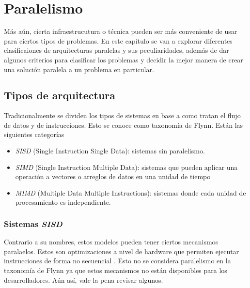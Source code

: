 \chapter{Paralelismo}
\label{cap:paralelism}

Más aún, cierta infraestrucutura o técnica pueden ser más conveniente de usar
para ciertos tipos de problemas. En este capítulo se van a explorar diferentes
clasificaiones de arquitecturas paralelas y sus peculiaridades, además de dar
algunos criterios para clasificar los problemas y decidir la mejor manera de
crear una solución paralela a un problema en particular.

\section{Tipos de arquitectura}

Tradicionalmente se dividen los tipos de sistemas en base a como tratan el flujo
de datos y de instrucciones. Esto se conoce como taxonomía de Flynn. Están las
siguientes  categorías

\begin{itemize}
  \item \textit{SISD} (Single Instruction Single Data): sistemas
    sin paralelismo.

  \item \textit{SIMD} (Single Instruction Multiple Data):
    sistemas que pueden aplicar una operación a vectores o arreglos de datos en
    una unidad de tiempo

  \item \textit{MIMD} (Multiple Data Multiple Instructions):
    sistemas donde cada unidad de procesamiento es independiente.
\end{itemize}

\subsection{Sistemas \textit{SISD}}

Contrario a su nombres, estos modelos pueden tener ciertos mecanismos
paralaelos. Estos son optimizaciones a nivel de hardware que permiten ejecutar
instrucciones de forma no secuencial . Esto no se considera
paralelismo en la taxonomía de Flynn ya que estos mecanismos no están
disponibles para los desarrolladores. Aún así, vale la pena revisar algunos.


